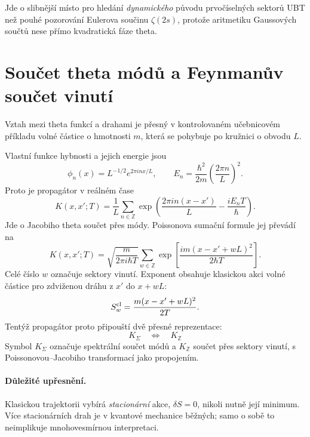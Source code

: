 Jde o slibnější místo pro hledání \emph{dynamického} původu prvočíselných
sektorů UBT než pouhé pozorování Eulerova součinu $\zeta(2s)$, protože
aritmetiku Gaussových součtů nese přímo kvadratická fáze theta.

\section{Součet theta módů a Feynmanův součet vinutí}
\label{sec:theta-feynman}

Vztah mezi theta funkcí a drahami je přesný v kontrolovaném učebnicovém
příkladu volné částice o hmotnosti $m$, která se pohybuje po kružnici o obvodu
$L$.

Vlastní funkce hybnosti a jejich energie jsou
\begin{equation}
 \phi_n(x)=L^{-1/2}e^{2\pi i n x/L},
 \qquad
 E_n=\frac{\hbar^2}{2m}\left(\frac{2\pi n}{L}\right)^2.
\end{equation}
Proto je propagátor v reálném čase
\begin{equation}
 K(x,x';T)
 =\frac1L\sum_{n\in\mathbb Z}
 \exp\!\left(\frac{2\pi i n(x-x')}{L}
             -\frac{iE_nT}{\hbar}\right).
 \label{eq:circle-mode-propagator}
\end{equation}
Jde o Jacobiho theta součet přes módy. Poissonova sumační formule jej převádí na
\begin{equation}
 \boxed{
 K(x,x';T)
 =\sqrt{\frac{m}{2\pi i\hbar T}}
  \sum_{w\in\mathbb Z}
  \exp\!\left[
   \frac{i m(x-x'+wL)^2}{2\hbar T}
  \right].}
 \label{eq:circle-winding-propagator}
\end{equation}
Celé číslo $w$ označuje sektory vinutí. Exponent obsahuje klasickou akci volné
částice pro zdviženou dráhu z $x'$ do $x+wL$:
\begin{equation}
 S_w^{\rm cl}=\frac{m(x-x'+wL)^2}{2T}.
\end{equation}
Tentýž propagátor proto připouští dvě přesné reprezentace:
\begin{equation}
 \boxed{
 K_\Sigma
 \quad\Longleftrightarrow\quad
 K_{\mathbb Z}}
 \label{eq:mode-winding-duality}
\end{equation}
Symbol $K_\Sigma$ označuje spektrální součet módů a $K_{\mathbb Z}$ součet přes
sektory vinutí,
s Poissonovou--Jacobiho transformací jako propojením.

\paragraph{Důležité upřesnění.}
Klasickou trajektorii vybírá \emph{stacionární} akce, $\delta S=0$, nikoli
nutně její minimum. Více stacionárních drah je v kvantové mechanice běžných;
samo o sobě to neimplikuje mnohovesmírnou interpretaci.

